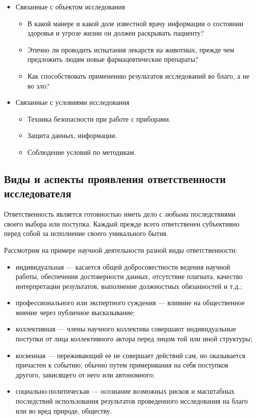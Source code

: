 \begin{itemize}
    \item Связанные с объектом исследования
    \begin{itemize}
        \item В какой манере и какой доле известной врачу информации о состоянии здоровья и угрозе жизни он должен раскрывать пациенту?
        \item Этично ли проводить испытания лекарств на животных, прежде чем предложить людям новые фармацевтические препараты?
        \item Как способствовать применению результатов исследований во благо, а не во зло?
    \end{itemize}
    \item Связанные с условиями исследования
    \begin{itemize}
        \item Техника безопасности при работе с приборами.
        \item Защита данных, информации.
        \item Соблюдение условий по методикам.
    \end{itemize}
\end{itemize}

\subsection{Виды и аспекты проявления ответственности исследователя}

Ответственность является готовностью иметь дело с \textit{любыми} последствиями своего выбора или поступка. Каждый прежде всего ответственен субъективно перед собой за исполнение своего уникального бытия.

Рассмотрим на примере научной деятельности разной виды ответственности: 
\begin{itemize}
    \item индивидуальная --- касается общей добросовестности ведения научной работы,
    обеспечения достоверности данных, отсутствие плагиата, качество интерпретации
    результатов, выполнение должностных обязанностей и т.д.;
    \item профессионального или экспертного суждения --- влияние на общественное
    мнение через публичное высказывание;
    \item коллективная --- члены научного коллектива совершают индивидуальные поступки от лица коллективного актора перед лицом той или иной структуры;
    \item косвенная --- переживающий ее не совершает действий сам, но оказывается причастен к событию, обычно путем примеривания на себя поступков другого, зависящего от него или автономного;
    \item социально-политическая --- осознание возможных рисков и масштабных последствий использования результатов проведенного исследования на благо или во вред природе, обществу.
\end{itemize}


